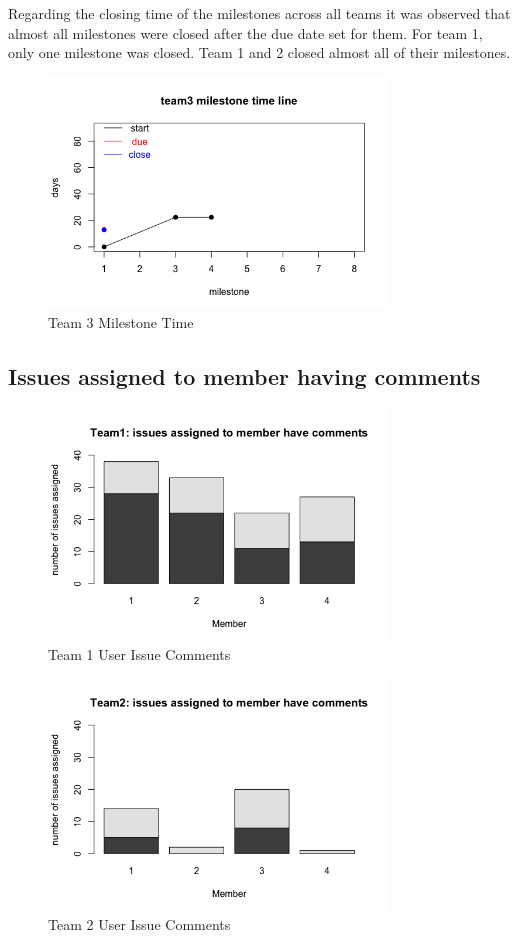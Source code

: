 \documentclass[conference]{IEEEtran}
\begin{document}
Regarding the closing time of the milestones across all teams it was observed that almost all milestones were closed after the due date set for them. For team 1, only one milestone was closed. Team 1 and 2 closed almost all of their milestones.

\begin{figure}[H]
    \centering
    \includegraphics[width=9cm]{../AprilProject/pic/team3_milestone_time.png}
    \caption{Team 3 Milestone Time}
    \label{team3_milestone_time}
\end{figure}

\subsection{Issues assigned to member having comments}



\begin{figure}[H]
    \centering
    \includegraphics[width=9cm]{../AprilProject/pic/team1_user_issue_comments.png}
    \caption{Team 1 User Issue Comments}
    \label{team1_issue_comment}
\end{figure}

\begin{figure}[H]
    \centering
    \includegraphics[width=9cm]{../AprilProject/pic/team2_user_issue_comments.png}
    \caption{Team 2 User Issue Comments}
    \label{team2_issue_comment}
\end{figure}
\end{document}
